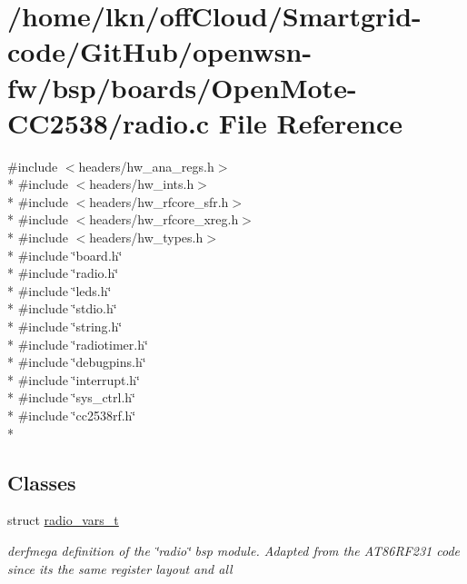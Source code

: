 \hypertarget{boards_2_open_mote-_c_c2538_2radio_8c}{}\section{/home/lkn/off\+Cloud/\+Smartgrid-\/code/\+Git\+Hub/openwsn-\/fw/bsp/boards/\+Open\+Mote-\/\+C\+C2538/radio.c File Reference}
\label{boards_2_open_mote-_c_c2538_2radio_8c}
{\ttfamily \#include $<$headers/hw\+\_\+ana\+\_\+regs.\+h$>$}\\*
{\ttfamily \#include $<$headers/hw\+\_\+ints.\+h$>$}\\*
{\ttfamily \#include $<$headers/hw\+\_\+rfcore\+\_\+sfr.\+h$>$}\\*
{\ttfamily \#include $<$headers/hw\+\_\+rfcore\+\_\+xreg.\+h$>$}\\*
{\ttfamily \#include $<$headers/hw\+\_\+types.\+h$>$}\\*
{\ttfamily \#include \char`\"{}board.\+h\char`\"{}}\\*
{\ttfamily \#include \char`\"{}radio.\+h\char`\"{}}\\*
{\ttfamily \#include \char`\"{}leds.\+h\char`\"{}}\\*
{\ttfamily \#include \char`\"{}stdio.\+h\char`\"{}}\\*
{\ttfamily \#include \char`\"{}string.\+h\char`\"{}}\\*
{\ttfamily \#include \char`\"{}radiotimer.\+h\char`\"{}}\\*
{\ttfamily \#include \char`\"{}debugpins.\+h\char`\"{}}\\*
{\ttfamily \#include \char`\"{}interrupt.\+h\char`\"{}}\\*
{\ttfamily \#include \char`\"{}sys\+\_\+ctrl.\+h\char`\"{}}\\*
{\ttfamily \#include \char`\"{}cc2538rf.\+h\char`\"{}}\\*
\subsection*{Classes}
\begin{DoxyCompactItemize}
\item 
struct \hyperlink{structradio__vars__t}{radio\+\_\+vars\+\_\+t}
\begin{DoxyCompactList}\small\item\em derfmega definition of the \char`\"{}radio\char`\"{} bsp module. Adapted from the A\+T86\+R\+F231 code since its the same register layout and all \end{DoxyCompactList}\end{DoxyCompactItemize}
